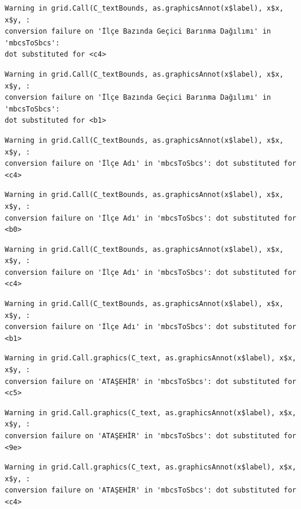 \documentclass[
  11pt,
  a4paper,
  DIV=11,
  numbers=noendperiod]{scrartcl}
\begin{document}
\begin{verbatim}
Warning in grid.Call(C_textBounds, as.graphicsAnnot(x$label), x$x, x$y, :
conversion failure on 'İlçe Bazında Geçici Barınma Dağılımı' in 'mbcsToSbcs':
dot substituted for <c4>
\end{verbatim}

\begin{verbatim}
Warning in grid.Call(C_textBounds, as.graphicsAnnot(x$label), x$x, x$y, :
conversion failure on 'İlçe Bazında Geçici Barınma Dağılımı' in 'mbcsToSbcs':
dot substituted for <b1>
\end{verbatim}

\begin{verbatim}
Warning in grid.Call(C_textBounds, as.graphicsAnnot(x$label), x$x, x$y, :
conversion failure on 'İlçe Adı' in 'mbcsToSbcs': dot substituted for <c4>
\end{verbatim}

\begin{verbatim}
Warning in grid.Call(C_textBounds, as.graphicsAnnot(x$label), x$x, x$y, :
conversion failure on 'İlçe Adı' in 'mbcsToSbcs': dot substituted for <b0>
\end{verbatim}

\begin{verbatim}
Warning in grid.Call(C_textBounds, as.graphicsAnnot(x$label), x$x, x$y, :
conversion failure on 'İlçe Adı' in 'mbcsToSbcs': dot substituted for <c4>
\end{verbatim}

\begin{verbatim}
Warning in grid.Call(C_textBounds, as.graphicsAnnot(x$label), x$x, x$y, :
conversion failure on 'İlçe Adı' in 'mbcsToSbcs': dot substituted for <b1>
\end{verbatim}

\begin{verbatim}
Warning in grid.Call.graphics(C_text, as.graphicsAnnot(x$label), x$x, x$y, :
conversion failure on 'ATAŞEHİR' in 'mbcsToSbcs': dot substituted for <c5>
\end{verbatim}

\begin{verbatim}
Warning in grid.Call.graphics(C_text, as.graphicsAnnot(x$label), x$x, x$y, :
conversion failure on 'ATAŞEHİR' in 'mbcsToSbcs': dot substituted for <9e>
\end{verbatim}

\begin{verbatim}
Warning in grid.Call.graphics(C_text, as.graphicsAnnot(x$label), x$x, x$y, :
conversion failure on 'ATAŞEHİR' in 'mbcsToSbcs': dot substituted for <c4>
\end{verbatim}
\end{document}
